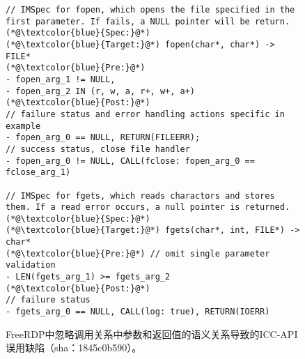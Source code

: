 \begin{figure}[t]
	\centering
	\begin{lstlisting}
// IMSpec for fopen, which opens the file specified in the first parameter. If fails, a NULL pointer will be return.
(*@\textcolor{blue}{Spec:}@*)
(*@\textcolor{blue}{Target:}@*) fopen(char*, char*) -> FILE*
(*@\textcolor{blue}{Pre:}@*) 
- fopen_arg_1 != NULL, 
- fopen_arg_2 IN (r, w, a, r+, w+, a+)
(*@\textcolor{blue}{Post:}@*) 
// failure status and error handling actions specific in example
- fopen_arg_0 == NULL, RETURN(FILEERR);
// success status, close file handler
- fopen_arg_0 != NULL, CALL(fclose: fopen_arg_0 == fclose_arg_1)

// IMSpec for fgets, which reads charactors and stores them. If a read error occurs, a null pointer is returned.
(*@\textcolor{blue}{Spec:}@*)
(*@\textcolor{blue}{Target:}@*) fgets(char*, int, FILE*) -> char*
(*@\textcolor{blue}{Pre:}@*) // omit single parameter validation
- LEN(fgets_arg_1) >= fgets_arg_2 
(*@\textcolor{blue}{Post:}@*)
// failure status 
- fgets_arg_0 == NULL, CALL(log: true), RETURN(IOERR)
	\end{lstlisting}
	\caption{
		FreeRDP中忽略调用关系中参数和返回值的语义关系导致的ICC-API误用缺陷（sha：1845c0b590）。
	}
	\label{fig:2-4-example-imspec}
\end{figure}
